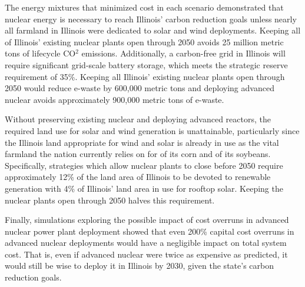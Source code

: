 The energy mixtures that minimized cost in each scenario demonstrated that nuclear energy is necessary to 
reach Illinois' carbon reduction goals unless nearly all farmland in 
Illinois were dedicated to solar and wind deployments. 
Keeping all of Illinois' existing nuclear plants open through 2050 avoids 25 
million metric tons of lifecycle CO$^2$ emissions. 
Additionally, a carbon-free grid in Illinois will require significant 
grid-scale battery storage,  which meets the strategic reserve requirement of 35\%.
Keeping all Illinois' existing nuclear plants open through 2050 would reduce 
e-waste by 600,000 metric tons and deploying advanced nuclear avoids 
approximately 900,000 metric tons of e-waste. 

Without preserving existing nuclear and deploying advanced reactors, the 
required land use for solar and wind generation is 
unattainable, particularly since the Illinois land appropriate for wind and solar 
is already in use as the vital farmland the nation currently relies on for  of its 
corn and  of its soybeans.
Specifically, strategies which allow nuclear plants to close before 2050 
require approximately 12\% of the land area of Illinois to be devoted to 
renewable generation  with  4\% of Illinois' land area in use for rooftop solar. 
Keeping the nuclear plants open through 2050 halves this requirement.

Finally, simulations exploring the possible impact of cost overruns in advanced nuclear power 
plant deployment showed that even 200\% capital cost overruns in advanced 
nuclear deployments would have a negligible impact on total system cost.
That is, even if advanced nuclear were twice as expensive as predicted, it 
would still be wise to deploy it in Illinois by 2030, given the state's carbon 
reduction goals.

